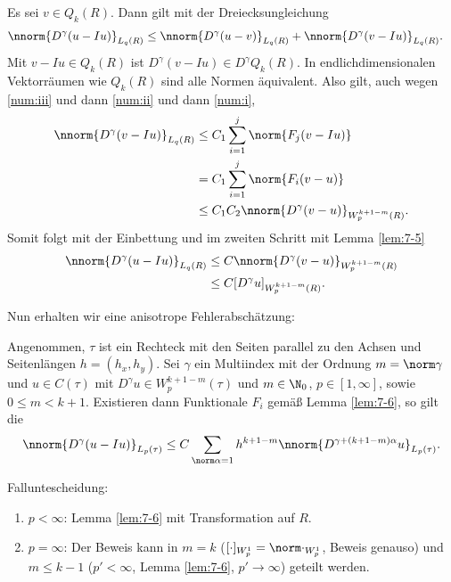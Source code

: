 \begin{beweis}
  Es sei $v \in Q_{k}(R)$. Dann gilt mit der Dreiecksungleichung
  \begin{align*}
    \nnorm{D^{\gamma}(u-Iu)}_{ L_{q}(R)}&\leq \nnorm{D^{\gamma}(u-v)}_{ L_{q}(R)} + \nnorm{D^{\gamma}(v-Iu)}_{ L_{q}(R)}. 
  \end{align*}
Mit $v - Iu \in Q_{k}(R)$ ist $D^{\gamma}(v - Iu)\in D^{\gamma}Q_{k}(R)$. In endlichdimensionalen Vektorräumen wie $Q_{k}(R)$ sind alle Normen äquivalent. Also gilt, auch wegen \ref{num:iii} und dann \ref{num:ii} und dann \ref{num:i},
\begin{align*}
  \nnorm{D^{\gamma}(v-Iu)}_{ L_{q}(R)} &\leq C_{1} \sum_{i = 1}^{j} \norm{F_{j}(v - Iu)}\\
&= C_{1} \sum_{i = 1}^{j} \norm{F_{i}(v - u)}\\
&\leq C_{1} C_{2} \nnorm{D^{\gamma}(v - u)}_{W_{p}^{k+1-m}(R)}. 
\end{align*}
Somit folgt mit der Einbettung und im zweiten Schritt mit Lemma \ref{lem:7-5}
\begin{align*}
    \nnorm{D^{\gamma}(u-Iu)}_{ L_{q}(R)}&\leq C \nnorm{D^{\gamma}(v-u)}_{W_{p}^{k+1-m}(R)}\\
    &\leq C [D^{\gamma}u]_{W_{p}^{k+1-m}(R)}. 
\end{align*}
\end{beweis}
Nun erhalten wir eine anisotrope Fehlerabschätzung:
\begin{satz}\label{thm:7-7}
  Angenommen, $\tau$ ist ein Rechteck mit den Seiten parallel zu den Achsen und Seitenlängen $h = (h_{x}, h_{y})$. Sei $\gamma$ ein Multiindex mit der Ordnung $m = \norm \gamma$ und $u \in C(\tau)$ mit $D^{\gamma} u \in W_{p}^{k+1-m}(\tau)$ und $m \in \N_{0}$, $p \in [1, \infty]$, sowie $0 \leq m < k+1$. Existieren dann Funktionale $F_{i}$ gemäß Lemma \ref{lem:7-6}, so gilt die 
  \begin{align*}
    \nnorm{D^{\gamma}(u - Iu)}_{L_{p}(\tau)} \leq C \sum_{\norm \alpha = 1} h^{k+1-m} \nnorm{D^{\gamma + (k+1-m)\alpha}u}_{L_{p}(\tau)}. 
  \end{align*}
\end{satz}

\begin{beweis}
Falluntescheidung:
\begin{enumerate}
\item $p < \infty$: Lemma \ref{lem:7-6} mit Transformation auf $R$. 
\item $p = \infty$: Der Beweis kann in $m = k$ ($[\cdot]_{W_{p}^{1}} = \norm \cdot _{W^{1}_{p}}$, Beweis genauso)
und $m \leq k-1$ ($p' < \infty$, Lemma \ref{lem:7-6}, $p' \to \infty$) geteilt werden.
\end{enumerate}
\end{beweis}

